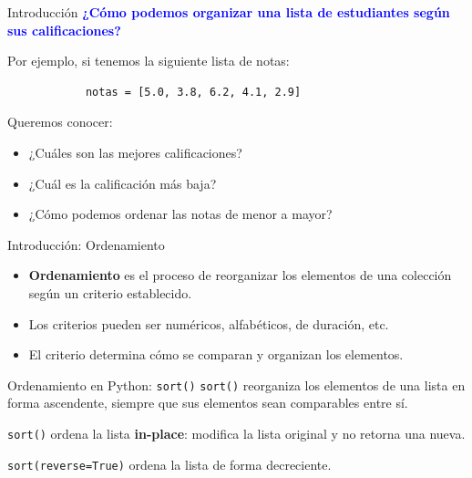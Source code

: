 \documentclass{beamer}
\begin{document}
    \begin{frame}[fragile, t]{Introducción}
        \textcolor{blue}{\textbf{¿Cómo podemos organizar una lista de estudiantes según sus calificaciones?}}
        
        Por ejemplo, si tenemos la siguiente lista de notas:

        \begin{verbatim}
            notas = [5.0, 3.8, 6.2, 4.1, 2.9]
        \end{verbatim}

        Queremos conocer:
        \begin{itemize}
            \item ¿Cuáles son las mejores calificaciones?
            \item ¿Cuál es la calificación más baja?
            \item ¿Cómo podemos ordenar las notas de menor a mayor?
        \end{itemize}
    \end{frame}

    \begin{frame}[fragile, t]{Introducción: Ordenamiento}
        \begin{itemize}
            \item \textbf{Ordenamiento} es el proceso de reorganizar los elementos de una colección 
            según un criterio establecido.
            \item Los criterios pueden ser numéricos, alfabéticos, de duración, etc.
            \item El criterio determina cómo se comparan y organizan los elementos.
        \end{itemize}
        
    \end{frame}

    \begin{frame}[fragile, t]{Ordenamiento en Python: \texttt{sort()}}
        \texttt{sort()} reorganiza los elementos de una lista en forma ascendente,
        siempre que sus elementos sean comparables entre sí.

        \pause

        \texttt{sort()} ordena la lista \textbf{in-place}:
        modifica la lista original y no retorna una nueva.

        \pause

        \texttt{sort(reverse=True)} ordena la lista de forma decreciente.
    \end{frame}
\end{document}

